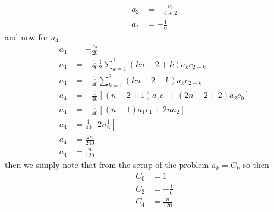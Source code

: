 \begin{align*}
    a_{2} &= -\frac{c_{0}}{4+2} \\
    a_{2} &= -\frac{1}{6}
\end{align*}
and now for $a_{4}$
\begin{align*}
    a_{4} &= -\frac{c_{2}}{20} \\
    a_{4} &= -\frac{1}{20}\frac{1}{2}\sum_{k=1}^{2}(kn-2+k)a_{k}c_{2-k} \\
    a_{4} &= -\frac{1}{40}\sum_{k=1}^{2}(kn-2+k)a_{k}c_{2-k} \\
    a_{4} &= -\frac{1}{40}\left[(n-2+1)a_{1}c_{1}+(2n-2+2)a_{2}c_{0}\right] \\
    a_{4} &= -\frac{1}{40}\left[(n-1)a_{1}c_{1}+2na_{2}\right] \\
    a_{4} &= \frac{1}{40}\left[2n\frac{1}{6}\right] \\
    a_{4} &= \frac{2n}{240} \\
    a_{4} &= \frac{n}{120}
\end{align*}
then we simply note that from the setup of the problem $a_{k} = C_{k}$ so then
\begin{align*}
    C_{0} &= 1 \\
    C_{2} &= -\frac{1}{6} \\
    C_{4} &= \frac{n}{120}    
\end{align*}

